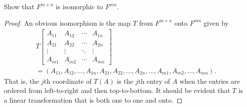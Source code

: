  Show that $F^{m\times n}$ is isomorphic to $F^{mn}$.
\begin{proof}
  An obvious isomorphism is the map $T$ from $F^{m\times n}$ onto
  $F^{mn}$ given by
  \begin{multline*}
    T
    \begin{bmatrix}
      A_{11} & A_{12} & \cdots & A_{1n} \\
      A_{21} & A_{22} & \cdots & A_{2n} \\
      \vdots & \vdots & \ddots & \vdots \\
      A_{m1} & A_{m2} & \cdots & A_{mn}
    \end{bmatrix} \\
    =
    (A_{11},A_{12},\dots,A_{1n},A_{21},A_{22},\dots,A_{2n},\dots,
    A_{m1},A_{m2},\dots,A_{mn}).
  \end{multline*}
  That is, the $j$th coordinate of $T(A)$ is the $j$th entry of $A$
  when the entries are ordered from left-to-right and then
  top-to-bottom. It should be evident that $T$ is a linear
  transformation that is both one to one and onto.
\end{proof}
